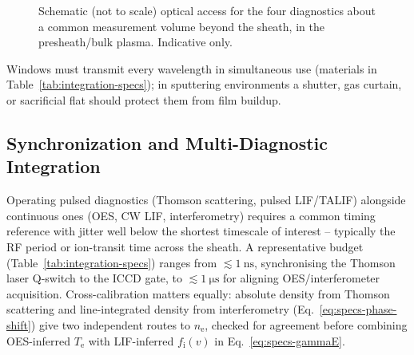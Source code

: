 \begin{figure}[htbp]
\centering
{}
\caption{Schematic (not to scale) optical access for the four diagnostics about a common measurement volume beyond the sheath, in the presheath/bulk plasma. Indicative only.}
\label{fig:optical-access-schematic}
\end{figure}

Windows must transmit every wavelength in simultaneous use (materials in Table~\ref{tab:integration-specs}); in sputtering environments a shutter, gas curtain, or sacrificial flat should protect them from film buildup.

\subsection{Synchronization and Multi-Diagnostic Integration}

Operating pulsed diagnostics (Thomson scattering, pulsed LIF/TALIF) alongside continuous ones (OES, CW LIF, interferometry) requires a common timing reference with jitter well below the shortest timescale of interest -- typically the RF period or ion-transit time across the sheath. A representative budget (Table~\ref{tab:integration-specs}) ranges from $\lesssim \SI{1}{\nano\second}$, synchronising the Thomson laser Q-switch to the ICCD gate, to $\lesssim \SI{1}{\micro\second}$ for aligning OES/interferometer acquisition. Cross-calibration matters equally: absolute density from Thomson scattering and line-integrated density from interferometry (Eq.~\eqref{eq:specs-phase-shift}) give two independent routes to $n_{\mathrm{e}}$, checked for agreement before combining OES-inferred $T_{\mathrm{e}}$ with LIF-inferred $f_{\mathrm{i}}(v)$ in Eq.~\eqref{eq:specs-gammaE}.

